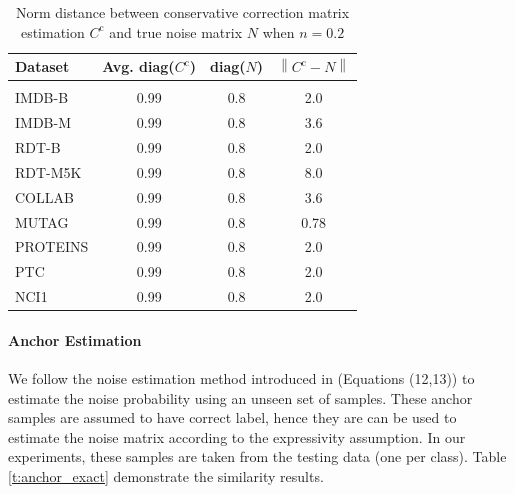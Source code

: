 \documentclass[letterpaper]{article}
\newcommand{\norm}[1]{\left\lVert#1\right\rVert}
\begin{document}
\begin{table}[h]
\caption{Norm distance between conservative correction matrix estimation
$C^{\text{c}}$ and true noise matrix $N$ when $n=0.2$}
\label{t:est_exact}
\begin{center}
\begin{tabular}{l|ccc}
\bf Dataset & Avg. diag($C^{\text{c}}$) & diag($N$) & $\norm{C^{\text{c}}-N}$ \\
\hline \\
IMDB-B   & 0.99 & 0.8 & 2.0 \\   
IMDB-M   & 0.99 & 0.8 & 3.6 \\ 
RDT-B    & 0.99 & 0.8 & 2.0 \\    
RDT-M5K  & 0.99 & 0.8 & 8.0 \\       
COLLAB   & 0.99 & 0.8 & 3.6 \\     
MUTAG    & 0.99 & 0.8 & 0.78 \\    
PROTEINS & 0.99 & 0.8 & 2.0 \\       
PTC      & 0.99 & 0.8 & 2.0 \\  
NCI1     & 0.99 & 0.8 & 2.0 \\   
\end{tabular}
\end{center}
\end{table}

\paragraph{Anchor Estimation} We follow the noise estimation method introduced
in \cite{patrini_dnn} (Equations (12,13)) to estimate the noise probability 
using an unseen set of samples. These anchor samples are assumed to have correct
label, hence they are can be used to estimate the noise matrix according to 
the expressivity assumption. In our experiments, these samples are taken from
the testing data (one per class). Table \ref{t:anchor_exact} demonstrate the
similarity results.
\end{document}
